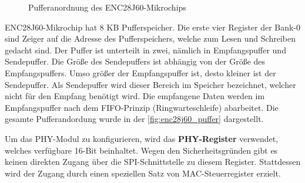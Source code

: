 \begin{figure}[htbp]
	\centering
	\caption[Pufferanordnung des ENC28J60-Mikrochips]{Pufferanordnung des ENC28J60-Mikrochips \cite{Microchip:ENC28J60:Datasheet}}\label{fig:enc28j60_puffer}
\end{figure}

ENC28J60-Mikrochip hat 8 KB Pufferspeicher. Die erste vier Register der Bank-0 sind Zeiger auf die Adresse des Pufferspeichers, welche zum Lesen und Schreiben gedacht sind. Der Puffer ist unterteilt in zwei, nämlich in Empfangspuffer und Sendepuffer. Die Größe des Sendepuffers ist abhängig von der Größe des Empfangspuffers. Umso größer der Empfangspuffer ist, desto kleiner ist der Sendepuffer. Als Sendepuffer wird dieser Bereich im Speicher bezeichnet, welcher nicht für den Empfang benötigt wird. Die empfangene Daten werden im Empfangspuffer nach dem FIFO-Prinzip (Ringwarteschleife) abarbeitet. Die gesamte Pufferandordung wurde in der \autoref{fig:enc28j60_puffer} dargestellt. \smallskip \smallskip

Um das PHY-Modul zu konfigurieren, wird das \textbf{PHY-Register} verwendet, welches verfügbare 16-Bit beinhaltet. Wegen den Sicherheitsgründen gibt es keinen direkten Zugang über die SPI-Schnittstelle zu diesem Register. Stattdessen wird der Zugang durch einen speziellen Satz von MAC-Steuerregister erzielt.




